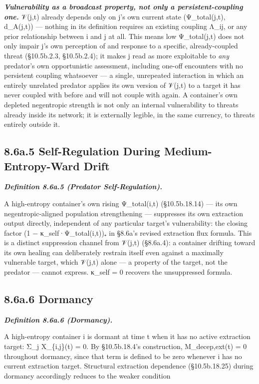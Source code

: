 \documentclass[
]{article}
\begin{document}
\emph{\textbf{Vulnerability as a broadcast property, not only a
persistent-coupling one.}} 𝒱(j,t) already depends only on j's own
current state (Ψ\_total(j,t), d\_A(j,t)) --- nothing in its definition
requires an existing coupling Λ\_ij, or any prior relationship between i
and j at all. This means low Ψ\_total(j,t) does not only impair j's own
perception of and response to a specific, already-coupled threat
(§10.5b.2.3, §10.5b.2.4); it makes j read as more exploitable to
\emph{any} predator's own opportunistic assessment, including one-off
encounters with no persistent coupling whatsoever --- a single,
unrepeated interaction in which an entirely unrelated predator applies
its own version of 𝒱(j,t) to a target it has never coupled with before
and will not couple with again. A container's own depleted negentropic
strength is not only an internal vulnerability to threats already inside
its network; it is externally legible, in the same currency, to threats
entirely outside it.

\hypertarget{a.5-self-regulation-during-medium-entropy-ward-drift}{%
\subsection{8.6a.5 Self-Regulation During Medium-Entropy-Ward
Drift}\label{a.5-self-regulation-during-medium-entropy-ward-drift}}

\emph{\textbf{Definition 8.6a.5 (Predator Self-Regulation).}}

A high-entropy container's own rising Ψ\_total(i,t) (§10.5b.18.14) ---
its own negentropic-aligned population strengthening --- suppresses its
own extraction output directly, independent of any particular target's
vulnerability: the closing factor (1 − κ\_self·Ψ\_total(i,t))₊ in
§8.6a's revised extraction flux formula. This is a distinct suppression
channel from 𝒱(j,t) (§8.6a.4): a container drifting toward its own
healing can deliberately restrain itself even against a maximally
vulnerable target, which 𝒱(j,t) alone --- a property of the target, not
the predator --- cannot express. κ\_self = 0 recovers the unsuppressed
formula.

\hypertarget{a.6-dormancy}{%
\subsection{8.6a.6 Dormancy}\label{a.6-dormancy}}

\emph{\textbf{Definition 8.6a.6 (Dormancy).}}

A high-entropy container i is dormant at time t when it has no active
extraction target: Σ\_j X\_\{i,j\}(t) = 0. By §10.5b.18.4's
construction, M\_decep,ext(t) = 0 throughout dormancy, since that term
is defined to be zero whenever i has no current extraction target.
Structural extraction dependence (§10.5b.18.25) during dormancy
accordingly reduces to the weaker condition
\end{document}
